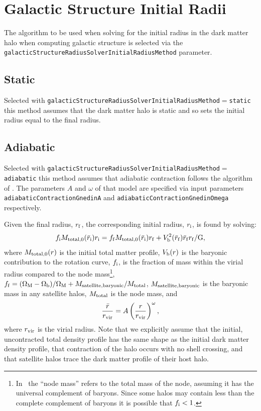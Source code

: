 \section{Galactic Structure Initial Radii}\label{sec:GalacticStructureInitialRadius}

The algorithm to be used when solving for the initial radius in the dark matter halo when computing galactic structure is selected via the {\tt galacticStructureRadiusSolverInitialRadiusMethod} parameter.

\subsection{Static}

Selected with {\tt galacticStructureRadiusSolverInitialRadiusMethod}$=${\tt static} this method assumes that the dark matter halo is static and so sets the initial radius equal to the final radius. 

\subsection{Adiabatic}

Selected with {\tt galacticStructureRadiusSolverInitialRadiusMethod}$=${\tt adiabatic} this method assumes that adiabatic contraction follows the algorithm of \cite{gnedin_response_2004}. The parameters $A$ and $\omega$ of that model are specified via input parameters {\tt adiabaticContractionGnedinA} and {\tt adiabaticContractionGnedinOmega} respectively.

Given the final radius, $r_{\rm f}$, the corresponding initial radius, $r_{\rm i}$, is found by solving:
\begin{equation}
f_{\rm i} M_{\rm total,0}(\bar{r}_{\rm i}) r_{\rm i} = f_{\rm f} M_{\rm total,0}(\bar{r}_{\rm i}) r_{\rm f} + V^2_{\rm b}(\bar{r}_{\rm f}) \bar{r}_{\rm f} r_{\rm f}/ {\rm G},
 \label{eq:adiabaticContractionGnedinSolution}
\end{equation}
where $M_{\rm total,0}(r)$ is the initial total matter profile, $V_{\rm b}(r)$ is the baryonic contribution to the rotation curve, $f_{\rm i}$, is the fraction of mass within the virial radius compared to the node mass\footnote{In \protect\glc\ the ``node mass'' refers to the total mass of the node, assuming it has the universal complement of baryons. Since some halos may contain less than the complete complement of baryons it is possible that $f_{\rm i}<1$.}, $f_{\rm f}=(\Omega_{\rm M}-\Omega_{\rm b})/\Omega_{\rm M}+M_{\rm satellite, baryonic}/M_{\rm total}$, $M_{\rm satellite, baryonic}$ is the baryonic mass in any satellite halos, $M_{\rm total}$ is the node mass, and
\begin{equation}
{\bar{r} \over r_{\rm vir}} = A \left({r \over r_{\rm vir}}\right)^\omega,
\end{equation}
where $r_{\rm vir}$ is the virial radius. Note that we explicitly assume that the initial, uncontracted total density profile has the same shape as the initial dark matter density profile, that contraction of the halo occurs with no shell crossing, and that satellite halos trace the dark matter profile of their host halo.

